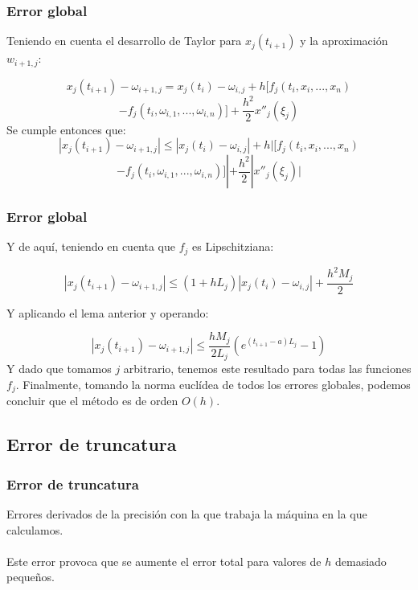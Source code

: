 \documentclass{beamer}
\begin{document}
\begin{frame}
	\frametitle{Error global}

	Teniendo en cuenta el desarrollo de Taylor para $x_j(t_{i+1})$ y la aproximación $w_{i+1,j}$:
	
	$$
	x_j(t_{i+1}) - \omega_{i+1,j} = x_j(t_i) - \omega_{i,j} + h[f_j(t_i, x_i, ..., x_n) $$
	$$- f_j(t_i, \omega_{i,1}, ..., \omega_{i,n})] + \frac{h^2}{2}x''_j(\xi_j) $$
	Se cumple entonces que:
	$$ | x_j(t_{i+1}) - \omega_{i+1,j} | \leq | x_j(t_i) - \omega_{i,j} | + h|[f_j(t_i, x_i, ..., x_n) $$
	$$- f_j(t_i, \omega_{i,1}, ..., \omega_{i,n})]| + \frac{h^2}{2}|x''_j(\xi_j)| $$
	
\end{frame}

\begin{frame}
	\frametitle{Error global}
	Y de aquí, teniendo en cuenta que $f_j$ es Lipschitziana:
	
	$$ | x_j(t_{i+1}) - \omega_{i+1,j} | \leq (1+hL_j)| x_j(t_i) - \omega_{i,j} | + \frac{h^2M_j}{2} $$
	
	Y aplicando el lema anterior y operando:
	
	$$ | x_j(t_{i+1}) - \omega_{i+1, j} | \leq \frac{hM_j}{2L_j}(e^{(t_{i+1}-a)L_j} - 1) $$
	Y dado que tomamos $j$ arbitrario, tenemos este resultado para todas las funciones $f_j$. Finalmente, tomando la norma euclídea de todos los errores globales, podemos concluir que el método es de orden $O(h)$.
\end{frame}

\subsection{Error de truncatura}
\begin{frame}
	\frametitle{Error de truncatura}

	Errores derivados de la precisión con la que trabaja la máquina en la que calculamos.\\~\\

	Este error provoca que se aumente el error total para valores de $h$ demasiado pequeños.

\end{frame}
\end{document}
